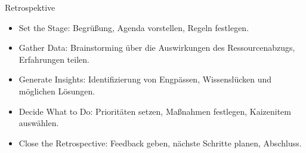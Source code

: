 \documentclass{article}
\begin{document}
\begin{exercise}{Retrospektive}
\begin{solution}
\begin{enumerate}
\begin{itemize}
              \item Set the Stage: Begrüßung, Agenda vorstellen, Regeln festlegen.
              \item Gather Data: Brainstorming über die Auswirkungen des Ressourcenabzugs, Erfahrungen teilen.
              \item Generate Insights: Identifizierung von Engpässen, Wissenslücken und möglichen Lösungen.
              \item Decide What to Do: Prioritäten setzen, Maßnahmen festlegen, Kaizenitem auswählen.
              \item Close the Retrospective: Feedback geben, nächste Schritte planen, Abschluss.
            \end{itemize}
    \end{enumerate}
  \end{solution}
\end{exercise}
\end{document}
